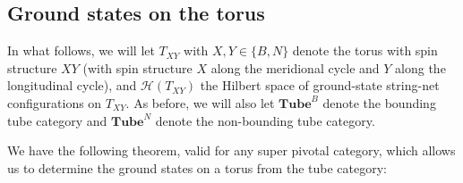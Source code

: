 \documentclass[12pt,a4paper]{article}
\newcommand{\mcz}{\mathcal{Z}}
\newcommand{\mch}{\mathcal{H}}
\newcommand\be            {\begin{equation}}
\newcommand\ee            {\end{equation}}
\newcommand{\tube}{\textbf{Tube}}
\begin{document}

\subsection{Ground states on the torus} \label{ground_states_on_torus}

In what follows, we will let $T_{XY}$ with $X,Y\in\{B,N\}$ denote the torus with spin structure $XY$
(with spin structure $X$ along the meridional cycle and $Y$ along the longitudinal cycle),
and $\mch(T_{XY})$ the Hilbert space of ground-state string-net configurations on $T_{XY}$.  
As before, we will also let $\tube^B$ denote the bounding tube category and $\tube^N$ denote the non-bounding tube category. 

We have the following theorem, valid for any super pivotal category, which allows us to determine 
the ground states on a torus from the tube category:
\end{document}
